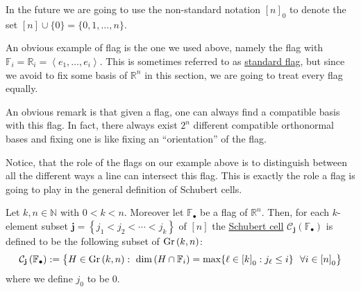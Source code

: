 In the future we are going to use the non-standard notation ${[n]}_0$ to denote the set $[n]\cup\{0\}=\{0,1,\ldots,n\}$.

An obvious example of flag is the one we used above, namely the flag with $\mathbb{F}_i=\mathbb{R}_i=\left<e_1,\ldots,e_i\right>$. This is sometimes referred to as \ul{standard flag}, but since we avoid to fix some basis of $\mathbb{R}^n$ in this section, we are going to treat every flag equally.

An obvious remark is that given a flag, one can always find a compatible basis with this flag. In fact, there always exist $2^n$ different compatible orthonormal bases and fixing one is like fixing an ``orientation'' of the flag.

Notice, that the role of the flags on our example above is to distinguish between all the different ways a line can intersect this flag. This is exactly the role a flag is going to play in the general definition of Schubert cells.

\begin{definition} Let $k,n\in\mathbb{N}$ with $0<k<n$. Moreover let $\mathbb{F}_{\bullet}$ be a flag of $\mathbb{R}^n$. Then, for each $k$-element subset $\mathbf{j}=\left\{j_1<j_2<\cdots<j_k\right\}$ of $[n]$ the \ul{Schubert cell} $\mathcal{C}_{\mathbf{j}}\left(\mathbb{F}_{\bullet}\right)$ is defined to be the following subset of $\Gr{k}{n}$:
\[\mathcal{C}_{\mathbf{j}}\left(\mathbb{F}_{\bullet}\right):=\big\{H\in\Gr{k}{n}:\ \dim\left(H\cap\mathbb{F}_i\right)=\max\{\ell\in{[k]}_0:j_{\ell}\leq i\}\ \ \forall i\in{[n]}_0\big\}\]
where we define $j_0$ to be $0$.
\end{definition}

